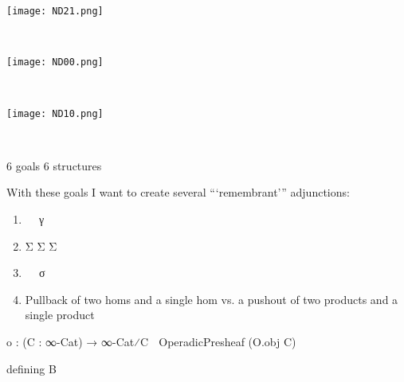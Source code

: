 \documentclass{book}
\theoremstyle{definition}
\begin{document}
\begin{center}
\texttt{[image: ND21.png]} \\
\end{center}


\newpage

\ \\

\begin{center}
\texttt{[image: ND00.png]} \\
\end{center}

\ \\

\begin{center}
\texttt{[image: ND10.png]} \\
\end{center}

\ \\

\iffalse 
Sorry, I lost this image.
\begin{center}
\texttt{[image: ND20.png]} \\
\end{center}
\fi


\newpage


6 goals
6 structures

With these goals I want to create several ```remembrant''' adjunctions:

\iffalse
\begin{center}
Ω${}^{∞}$ : ∞-Cat ⇄ C-InfinityCategory ∞-Cat
\end{center}
Ω${}^{∞}$ 
\fi




\begin{enumerate}
\item γ⃗ γ⃡ γ
\item Σ⃗ Σ⃡ Σ
\item σ⃗ σ⃡ σ
\item Pullback of two homs and a single hom vs. a pushout of two products and a single product
\end{enumerate}



\begin{center}
o⃗ : (C : ∞-Cat) → ∞-Cat⁄C ⭢ OperadicPresheaf (O⃗.obj C)
\end{center}

defining B
\end{document}
